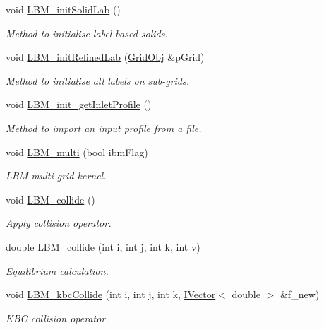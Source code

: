 \begin{DoxyCompactItemize}
void \hyperlink{class_grid_obj_a5dd08730d7cdea576bb4b337786a9bcf}{L\+B\+M\+\_\+init\+Solid\+Lab} ()
\begin{DoxyCompactList}\small\item\em Method to initialise label-\/based solids. \end{DoxyCompactList}\item 
void \hyperlink{class_grid_obj_a3ba133d06625fb576ca0909b946033b2}{L\+B\+M\+\_\+init\+Refined\+Lab} (\hyperlink{class_grid_obj}{Grid\+Obj} \&p\+Grid)
\begin{DoxyCompactList}\small\item\em Method to initialise all labels on sub-\/grids. \end{DoxyCompactList}\item 
void \hyperlink{class_grid_obj_a023713976673d029103690a91c5415f9}{L\+B\+M\+\_\+init\+\_\+get\+Inlet\+Profile} ()
\begin{DoxyCompactList}\small\item\em Method to import an input profile from a file. \end{DoxyCompactList}\item 
void \hyperlink{class_grid_obj_ac69eef5f465527c9ccf8941115c68770}{L\+B\+M\+\_\+multi} (bool ibm\+Flag)
\begin{DoxyCompactList}\small\item\em L\+BM multi-\/grid kernel. \end{DoxyCompactList}\item 
void \hyperlink{class_grid_obj_a0feb0f9406f626e90c57045350161b22}{L\+B\+M\+\_\+collide} ()
\begin{DoxyCompactList}\small\item\em Apply collision operator. \end{DoxyCompactList}\item 
double \hyperlink{class_grid_obj_a1540c0d77a47e60a7fd55f51e5a98451}{L\+B\+M\+\_\+collide} (int i, int j, int k, int v)
\begin{DoxyCompactList}\small\item\em Equilibrium calculation. \end{DoxyCompactList}\item 
void \hyperlink{class_grid_obj_ac4ca0327a53171fe8e1c3076e9f1353f}{L\+B\+M\+\_\+kbc\+Collide} (int i, int j, int k, \hyperlink{class_i_vector}{I\+Vector}$<$ double $>$ \&f\+\_\+new)
\begin{DoxyCompactList}\small\item\em K\+BC collision operator. \end{DoxyCompactList}\item 

\end{DoxyCompactItemize}
